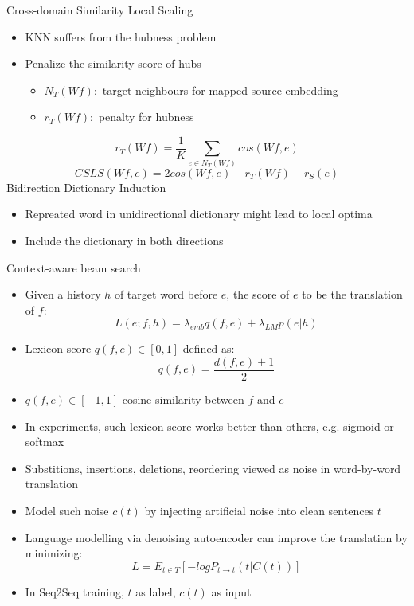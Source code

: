 \documentclass[11pt, a4paper, landscape]{article}
\begin{document}
	\vfill
	Cross-domain Similarity Local Scaling
	\begin{itemize}
		\item KNN suffers from the hubness problem
		\item Penalize the similarity score of hubs
			\begin{itemize}
				\item $N_T(Wf):$ target neighbours for mapped source embedding
				\item $r_T(W f):$ penalty for hubness
			\end{itemize}
	\end{itemize}
	\[r_T(W f) = \frac{1}{K} \sum_{e \in N_T(Wf)}cos(Wf, e) \]
	\[ CSLS(Wf, e) = 2cos(Wf, e)-r_{T}(Wf)-r_{S}(e)\]
	Bidirection Dictionary Induction

	\begin{itemize}
		\item Repreated word in unidirectional dictionary might lead to local optima
		\item Include the dictionary in both directions
	\end{itemize}
	\vfill
	\NewPage
	\vfill
	Context-aware beam search
	\begin{itemize}
		\item Given a history $h$ of target word before $e$, the score of $e$ to be the translation of $f$:
		\[ L(e;f,h)=\lambda_{emb}q(f,e) + \lambda_{LM}p(e|h)\]
		\item Lexicon score $q(f,e) \in [0,1] $ defined as:
		\[ q(f,e)= \frac{d(f,e)+1}{2}\]
		\item $q(f,e)\in [-1,1]$ cosine similarity between $f$ and $e$
		\item In experiments, such lexicon score works better than others, e.g. sigmoid or softmax
	\end{itemize}
	
	\vfill
	\NewPage
	\vfill
	
	
	\begin{itemize}
		\item Substitions, insertions, deletions, reordering viewed as noise in word-by-word translation
		\item Model such noise $c(t)$ by injecting artificial noise into clean sentences $t$
		\item Language modelling via denoising autoencoder can improve the translation by minimizing:
		\[ L = E_{t \in T}[-logP_{t\rightarrow t}(t|C(t))]\]
		\item In Seq2Seq training, $t$ as label, $c(t)$  as input 
	\end{itemize}
	
\end{document}
